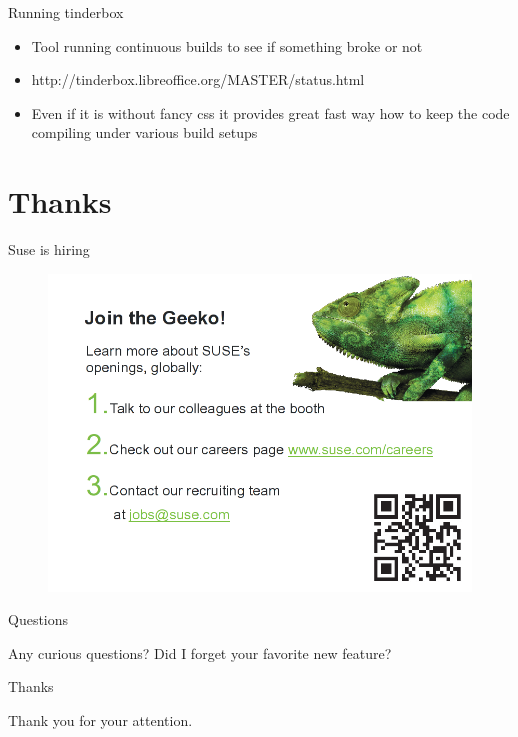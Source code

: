 \documentclass{beamer}
\begin{document}
\begin{frame}[t]{Running tinderbox}
	\begin{itemize}
	\item Tool running continuous builds to see if something broke or not
	\item http://tinderbox.libreoffice.org/MASTER/status.html
	\item Even if it is without fancy css it provides great fast way how to keep the code compiling under various build setups
	\end{itemize}
\end{frame}

\section{Thanks}

\begin{frame}{Suse is hiring}
	\begin{figure}
	\includegraphics[width= 0.8\linewidth]{suse_hiring.png}
	\end{figure}
\end{frame}

\begin{frame}{Questions}
	\begin{center}
	Any curious questions? Did I forget your favorite new feature?
	\end{center}
\end{frame}

\begin{frame}{Thanks}
	\begin{center}
	Thank you for your attention.
	\end{center}
\end{frame}
\end{document}
